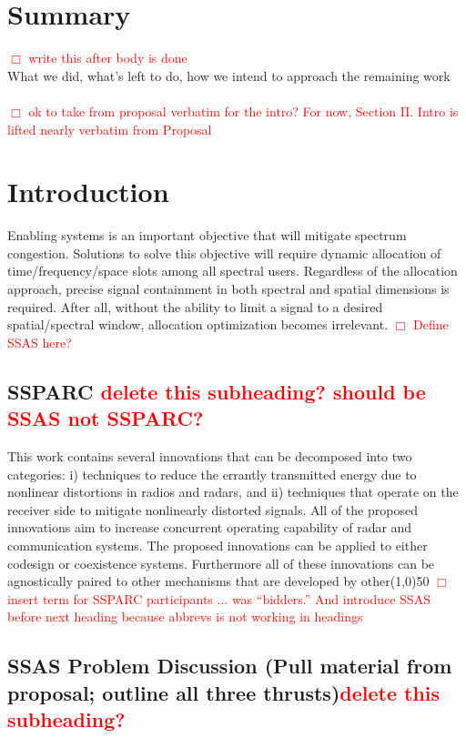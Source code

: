 
\section{Summary} 
\textcolor{red}{$\Box$ write this after body is done}\\What we did, what’s left to do, how we intend to approach the remaining work\\
\\\textcolor{red}{$\Box$ ok to take from proposal verbatim for the intro?   For now, Section II. Intro is lifted nearly verbatim from Proposal}
\section{Introduction}
Enabling \SSPARC systems is an important objective that will mitigate spectrum congestion.  Solutions to solve this objective will require dynamic allocation of time/frequency/space slots among all spectral users.  Regardless of the allocation approach, precise signal containment in both spectral and spatial dimensions is required.  After all, without the ability to limit a signal to a desired spatial/spectral window, allocation optimization becomes irrelevant.  \textcolor{red}{$\Box$ Define SSAS here?}\par


\subsection{SSPARC \textcolor{red}{delete this subheading? should be SSAS not SSPARC?}}

This work contains several innovations that can be decomposed into two categories: i) techniques to reduce the errantly transmitted energy due to nonlinear distortions in \SSPARC radios and radars, and ii) techniques that operate on the receiver side to mitigate nonlinearly distorted signals.  All of the proposed innovations aim to increase concurrent operating capability of radar and communication systems.  The proposed innovations can be applied to either codesign or coexistence \SSPARC systems.  Furthermore all of these innovations can be agnostically paired to other \SSPARC mechanisms that are developed by other\line(1,0){50}  \textcolor{red}{$\Box$ insert term for SSPARC participants ... was ``bidders.''  And introduce SSAS before next heading because abbrevs is not working in headings}
\subsection{SSAS Problem Discussion
 (Pull material from proposal; outline all three thrusts)\textcolor{red}{delete this subheading?}}
